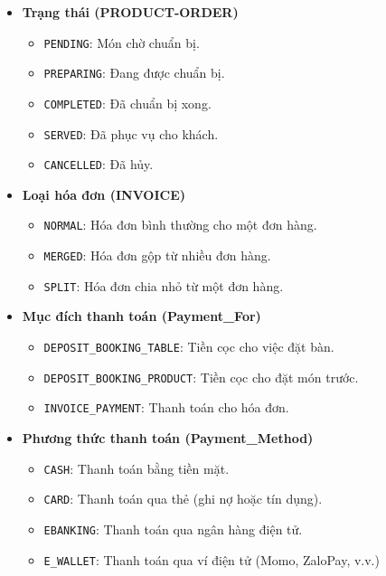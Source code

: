 \begin{itemize}
  \item \textbf{Trạng thái (PRODUCT-ORDER)}
    \begin{itemize}
        \item \texttt{PENDING}: Món chờ chuẩn bị.
        \item \texttt{PREPARING}: Đang được chuẩn bị.
        \item \texttt{COMPLETED}: Đã chuẩn bị xong.
        \item \texttt{SERVED}: Đã phục vụ cho khách.
        \item \texttt{CANCELLED}: Đã hủy.
    \end{itemize}

  \item \textbf{Loại hóa đơn (INVOICE)}
    \begin{itemize}
        \item \texttt{NORMAL}: Hóa đơn bình thường cho một đơn hàng.
        \item \texttt{MERGED}: Hóa đơn gộp từ nhiều đơn hàng.
        \item \texttt{SPLIT}: Hóa đơn chia nhỏ từ một đơn hàng.
    \end{itemize}

  \item \textbf{Mục đích thanh toán (Payment\_For)}
    \begin{itemize}
        \item \texttt{DEPOSIT\_BOOKING\_TABLE}: Tiền cọc cho việc đặt bàn.
        \item \texttt{DEPOSIT\_BOOKING\_PRODUCT}: Tiền cọc cho đặt món trước.
        \item \texttt{INVOICE\_PAYMENT}: Thanh toán cho hóa đơn.
    \end{itemize}

  \item \textbf{Phương thức thanh toán (Payment\_Method)}
    \begin{itemize}
        \item \texttt{CASH}: Thanh toán bằng tiền mặt.
        \item \texttt{CARD}: Thanh toán qua thẻ (ghi nợ hoặc tín dụng).
        \item \texttt{EBANKING}: Thanh toán qua ngân hàng điện tử.
        \item \texttt{E\_WALLET}: Thanh toán qua ví điện tử (Momo, ZaloPay, v.v.)
    \end{itemize}
\end{itemize}

